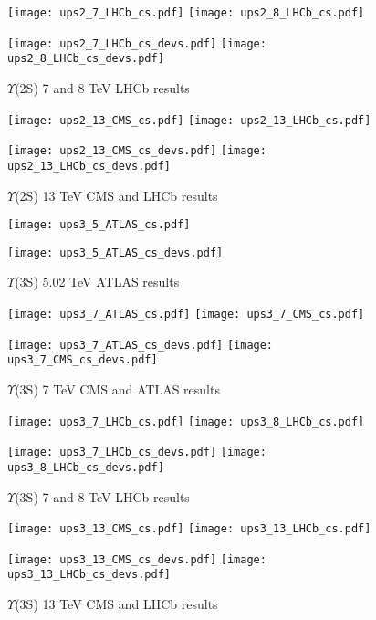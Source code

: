 \documentclass{article}
\begin{document}
\clearpage

\begin{figure}
\centering
\texttt{[image: ups2\_7\_LHCb\_cs.pdf]}
\texttt{[image: ups2\_8\_LHCb\_cs.pdf]}

\texttt{[image: ups2\_7\_LHCb\_cs\_devs.pdf]}
\texttt{[image: ups2\_8\_LHCb\_cs\_devs.pdf]}
\caption{$\Upsilon$(2S) 7 and 8 TeV LHCb results}
\end{figure}

\clearpage

\begin{figure}
\centering
\texttt{[image: ups2\_13\_CMS\_cs.pdf]}
\texttt{[image: ups2\_13\_LHCb\_cs.pdf]}

\texttt{[image: ups2\_13\_CMS\_cs\_devs.pdf]}
\texttt{[image: ups2\_13\_LHCb\_cs\_devs.pdf]}
\caption{$\Upsilon$(2S) 13 TeV CMS and LHCb results}
\end{figure}

\clearpage

\begin{figure}
\centering
\texttt{[image: ups3\_5\_ATLAS\_cs.pdf]}

\texttt{[image: ups3\_5\_ATLAS\_cs\_devs.pdf]}
\caption{$\Upsilon$(3S) 5.02 TeV ATLAS results}
\end{figure}

\clearpage

\begin{figure}
\centering
\texttt{[image: ups3\_7\_ATLAS\_cs.pdf]}
\texttt{[image: ups3\_7\_CMS\_cs.pdf]}

\texttt{[image: ups3\_7\_ATLAS\_cs\_devs.pdf]}
\texttt{[image: ups3\_7\_CMS\_cs\_devs.pdf]}
\caption{$\Upsilon$(3S) 7 TeV CMS and ATLAS results}
\end{figure}

\clearpage

\begin{figure}
\centering
\texttt{[image: ups3\_7\_LHCb\_cs.pdf]}
\texttt{[image: ups3\_8\_LHCb\_cs.pdf]}

\texttt{[image: ups3\_7\_LHCb\_cs\_devs.pdf]}
\texttt{[image: ups3\_8\_LHCb\_cs\_devs.pdf]}
\caption{$\Upsilon$(3S) 7 and 8 TeV LHCb results}
\end{figure}

\clearpage

\begin{figure}
\centering
\texttt{[image: ups3\_13\_CMS\_cs.pdf]}
\texttt{[image: ups3\_13\_LHCb\_cs.pdf]}

\texttt{[image: ups3\_13\_CMS\_cs\_devs.pdf]}
\texttt{[image: ups3\_13\_LHCb\_cs\_devs.pdf]}
\caption{$\Upsilon$(3S) 13 TeV CMS and LHCb results}
\end{figure}


\clearpage
\restoregeometry


\end{document}

